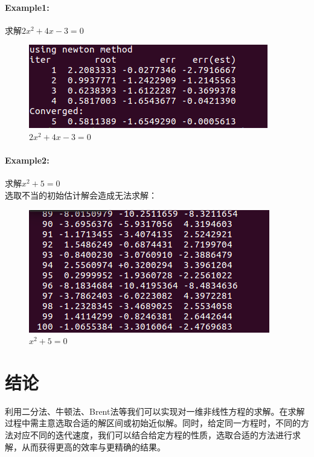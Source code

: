 \documentclass{article}
\begin{document}
	\paragraph{Example1:}求解$2x^2+4x-3=0$
	\begin{figure}[ht]
		\includegraphics[width=1\linewidth]{images/n2.png}
		\caption{$2x^2+4x-3=0$}
	\end{figure}
	\paragraph{Example2:}求解$x^2+5=0$ \\
	选取不当的初始估计解会造成无法求解：
	\begin{figure}[ht]

		\includegraphics[width=1\linewidth]{images/n3.png}
		\caption{$x^2+5=0$}
	\end{figure}
	\section{结论} 
	利用二分法、牛顿法、Brent法等我们可以实现对一维非线性方程的求解。在求解过程中需主意选取合适的解区间或初始近似解。同时，给定同一方程时，不同的方法对应不同的迭代速度，我们可以结合给定方程的性质，选取合适的方法进行求解，从而获得更高的效率与更精确的结果。
	
	
\end{document}
